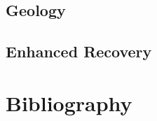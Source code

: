 \documentclass[11pt]{article}
\begin{document}
\subsection{Geology}
\label{sec:orge59c510}

\subsubsection{}
\label{sec:orgfdb8938}

\subsection{Enhanced Recovery}
\label{sec:orgb062b5b}

\subsubsection{}
\label{sec:org35d5a06}

\section{Bibliography}
\label{sec:org34e2592}


\end{document}
